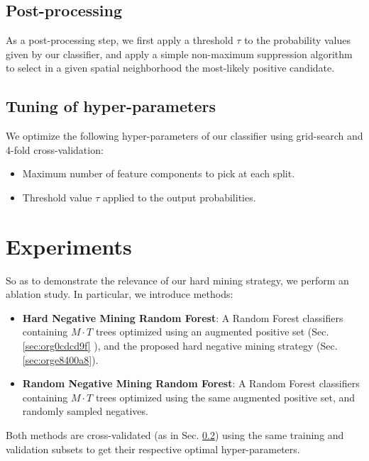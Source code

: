 \documentclass[11pt]{article}
\begin{document}
\subsection{Post-processing}
\label{sec:org8d5a429}

As a post-processing step, we first apply a threshold \(\tau\) to the probability values given
by our classifier,
and apply a simple non-maximum suppression algorithm to select
in a given spatial neighborhood
the most-likely positive candidate.

\subsection{Tuning of hyper-parameters}
\label{sec:org830230b}

We optimize the following hyper-parameters of our classifier using grid-search and 4-fold cross-validation:

\begin{itemize}
\item Maximum number of feature components to pick at each split.
\item Threshold value \(\tau\) applied to the output probabilities.
\end{itemize}

\section{Experiments}
\label{sec:org680a1cc}

So as to demonstrate the relevance of our hard mining strategy, we perform an ablation study.
In particular, we introduce methods:

\begin{itemize}
\item \textbf{Hard Negative Mining Random Forest}: A Random Forest classifiers containing \(M \cdot T\) trees
optimized using an augmented positive set (Sec. \ref{sec:org0cdcd9f} ), and the proposed hard negative mining strategy (Sec. \ref{sec:orge8400a8}).
\item \textbf{Random Negative Mining Random Forest}: A Random Forest classifiers containing \(M \cdot T\) trees
optimized using the same augmented positive set, and randomly sampled negatives.
\end{itemize}

Both methods are cross-validated (as in Sec. \ref{sec:org830230b}) using the same training and validation subsets to get their respective
optimal hyper-parameters.
\end{document}
